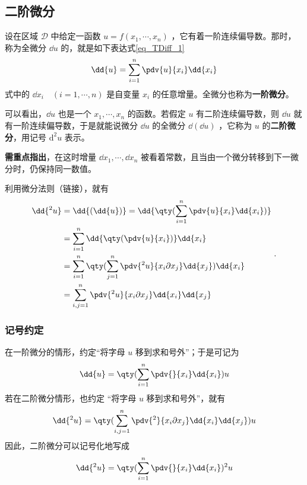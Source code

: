 \subsection{二阶微分}
设在区域 $\mathcal{D}$ 中给定一函数 $u=f(x_1,\cdots,x_n)$ ，它有着一阶连续偏导数。那时，称为全微分 $\dd{u}$ 的，就是如下表达式\autoref{eq_TDiff_1}~
\begin{equation}
\dd{u}=\sum_{i=1}^n \pdv{u}{x_i}\dd{x_i}
\end{equation}
式中的 $\dd{x_i}\quad(i=1,\cdots,n)$ 是自变量 $x_i$ 的任意增量。全微分也称为\textbf{一阶微分}。

可以看出，$\dd{u}$ 也是一个 $x_1,\cdots,x_n$ 的函数。若假定 $u$ 有二阶连续偏导数，则 $\dd{u}$ 就有一阶连续偏导数，于是就能说微分 $\dd{u}$ 的全微分 $\dd{(\dd u)}$ ，它称为 $u$ 的\textbf{二阶微分}，用记号 $\mathrm{d}^2u$ 表示。

\textbf{需重点指出}，在这时增量 $\dd{x_1},\cdots,\dd{x_n}$ 被看着常数，且当由一个微分转移到下一微分时，仍保持同一数值。

利用微分法则（链接），就有
\begin{equation}
\begin{aligned}
\dd{^2u}&=\dd{(\dd{u})}=\dd{\qty(\sum_{i=1}^n \pdv{u}{x_i}\dd{x_i})}\\
&=\sum_{i=1}^n \dd{\qty(\pdv{u}{x_i})}\dd{x_i}\\
&=\sum_{i=1}^n\qty(\sum_{j=1}^n\pdv{^2u}{x_i\partial x_j} \dd{x_j})\dd{x_i}\\
&=\sum_{i,j=1}^n\pdv{^2u}{x_i\partial x_j} \dd{x_i}\dd{x_j}
\end{aligned}~.
\end{equation}
\subsubsection{记号约定}
在一阶微分的情形，约定“将字母 $u$ 移到求和号外”；于是可记为
\begin{equation}
\dd{u}=\qty(\sum_{i=1}^n\pdv{}{x_i}\dd{x_i})u
\end{equation}
若在二阶微分情形，也约定 “将字母 $u$ 移到求和号外”，就有
\begin{equation}
\dd{^2u}=\qty(\sum_{i,j=1}^n\pdv{^2}{x_i\partial x_j} \dd{x_i}\dd{x_j})u
\end{equation}
因此，二阶微分可以记号化地写成
\begin{equation}
\dd{^2u}=\qty(\sum_{i=1}^n\pdv{}{x_i} \dd{x_i})^2u
\end{equation}
